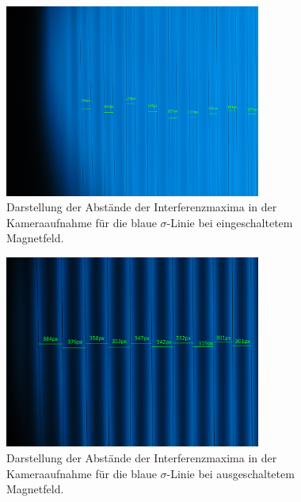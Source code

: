 %
\begin{figure}[h]
    \centering
    \includegraphics[width=0.75\textwidth]{figure/blausigma_bfeld_bearbeitet.jpg}
    \caption{Darstellung der Abstände der Interferenzmaxima in der Kameraaufnahme für die blaue $\sigma$-Linie bei eingeschaltetem Magnetfeld.}
    \label{fig:blausigma_b}
\end{figure}
%
\begin{figure}[h]
    \centering
    \includegraphics[width=0.75\textwidth]{figure/blausigma_bearbeitet.jpg}
    \caption{Darstellung der Abstände der Interferenzmaxima in der Kameraaufnahme für die blaue $\sigma$-Linie bei ausgeschaltetem Magnetfeld.}
    \label{fig:blausigma}
\end{figure}
%
